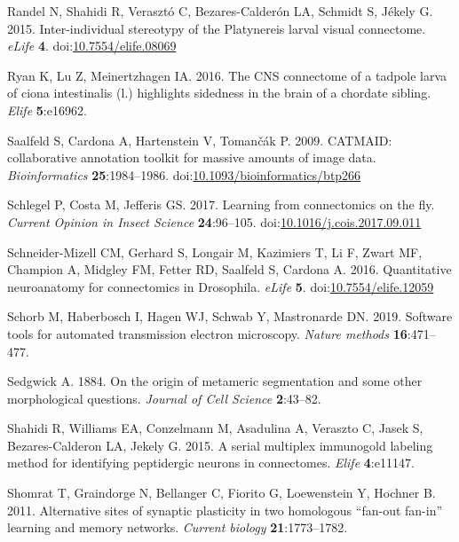 \documentclass[
  11pt,
]{article}
\newlength{\cslhangindent}
\newenvironment{CSLReferences}[2] %
 {\begin{list}{}{%
  \setlength{\itemindent}{0pt}
  \setlength{\leftmargin}{0pt}
  \setlength{\parsep}{0pt}
  \ifodd #1
   \setlength{\leftmargin}{\cslhangindent}
   \setlength{\itemindent}{-1\cslhangindent}
  \fi
  \setlength{\itemsep}{#2\baselineskip}}}
 {\end{list}}
\begin{document}
\begin{CSLReferences}{1}{0}
Randel N, Shahidi R, Verasztó C, Bezares-Calderón LA, Schmidt S, Jékely
G. 2015. Inter-individual stereotypy of the Platynereis larval visual
connectome. \emph{eLife} \textbf{4}.
doi:\href{https://doi.org/10.7554/elife.08069}{10.7554/elife.08069}

Ryan K, Lu Z, Meinertzhagen IA. 2016. The CNS connectome of a tadpole
larva of ciona intestinalis (l.) highlights sidedness in the brain of a
chordate sibling. \emph{Elife} \textbf{5}:e16962.

Saalfeld S, Cardona A, Hartenstein V, Tomančák P. 2009. CATMAID:
collaborative annotation toolkit for massive amounts of image data.
\emph{Bioinformatics} \textbf{25}:1984--1986.
doi:\href{https://doi.org/10.1093/bioinformatics/btp266}{10.1093/bioinformatics/btp266}

Schlegel P, Costa M, Jefferis GS. 2017. Learning from connectomics on
the fly. \emph{Current Opinion in Insect Science} \textbf{24}:96--105.
doi:\href{https://doi.org/10.1016/j.cois.2017.09.011}{10.1016/j.cois.2017.09.011}

Schneider-Mizell CM, Gerhard S, Longair M, Kazimiers T, Li F, Zwart MF,
Champion A, Midgley FM, Fetter RD, Saalfeld S, Cardona A. 2016.
Quantitative neuroanatomy for connectomics in Drosophila. \emph{eLife}
\textbf{5}.
doi:\href{https://doi.org/10.7554/elife.12059}{10.7554/elife.12059}

Schorb M, Haberbosch I, Hagen WJ, Schwab Y, Mastronarde DN. 2019.
Software tools for automated transmission electron microscopy.
\emph{Nature methods} \textbf{16}:471--477.

Sedgwick A. 1884. On the origin of metameric segmentation and some other
morphological questions. \emph{Journal of Cell Science}
\textbf{2}:43--82.

Shahidi R, Williams EA, Conzelmann M, Asadulina A, Veraszto C, Jasek S,
Bezares-Calderon LA, Jekely G. 2015. A serial multiplex immunogold
labeling method for identifying peptidergic neurons in connectomes.
\emph{Elife} \textbf{4}:e11147.

Shomrat T, Graindorge N, Bellanger C, Fiorito G, Loewenstein Y, Hochner
B. 2011. Alternative sites of synaptic plasticity in two homologous
{``fan-out fan-in''} learning and memory networks. \emph{Current
biology} \textbf{21}:1773--1782.


\end{CSLReferences}
\end{document}
